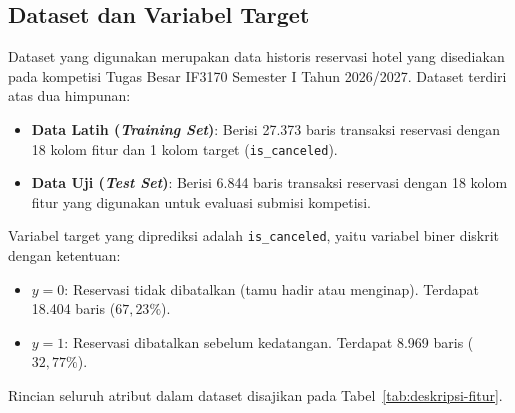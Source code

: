 \subsection{Dataset dan Variabel Target}

Dataset yang digunakan merupakan data historis reservasi hotel yang disediakan pada kompetisi
Tugas Besar IF3170 Semester I Tahun 2026/2027. Dataset terdiri atas dua himpunan:
\begin{itemize}
  \item \textbf{Data Latih (\textit{Training Set})}: Berisi 27.373 baris transaksi reservasi dengan 18 kolom fitur
        dan 1 kolom target (\texttt{is\_canceled}).
  \item \textbf{Data Uji (\textit{Test Set})}: Berisi 6.844 baris transaksi reservasi dengan 18 kolom fitur yang
        digunakan untuk evaluasi submisi kompetisi.
\end{itemize}

Variabel target yang diprediksi adalah \texttt{is\_canceled}, yaitu variabel biner diskrit dengan ketentuan:
\begin{itemize}
  \item $y = 0$: Reservasi tidak dibatalkan (tamu hadir atau menginap). Terdapat 18.404 baris ($67{,}23\%$).
  \item $y = 1$: Reservasi dibatalkan sebelum kedatangan. Terdapat 8.969 baris ($32{,}77\%$).
\end{itemize}

Rincian seluruh atribut dalam dataset disajikan pada Tabel~\ref{tab:deskripsi-fitur}.

